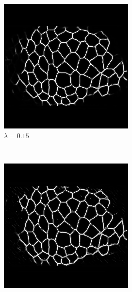 \documentclass[aps,prl,twocolumn,groupedaddress,amsmath,amssymb]{revtex4-1}
\begin{document}
\begin{figure}[tbp]
\begin{subfigure}[c]{0.45\linewidth}
            \includegraphics[width=\linewidth]{figures/27-15.png}
            \caption{$\lambda=0.15$}
        \end{subfigure}\\
        \begin{subfigure}[c]{0.45\linewidth}
            \includegraphics[width=\linewidth]{figures/27-25.png}

\end{subfigure}
\end{figure}
\end{document}
